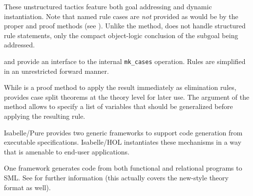 \begin{isabellebody}
\begin{isamarkuptext}
\begin{description}
  These unstructured tactics feature both goal addressing and dynamic
  instantiation.  Note that named rule cases are \emph{not} provided
  as would be by the proper \hyperlink{method.cases}{\mbox{}} and \hyperlink{method.induct}{\mbox{}} proof
  methods (see ).  Unlike the \hyperlink{method.induct}{\mbox{}} method, \hyperlink{method.induct-tac}{\mbox{}} does not handle structured rule
  statements, only the compact object-logic conclusion of the subgoal
  being addressed.
  
  \item \hyperlink{method.HOL.ind-cases}{\mbox{}} and \hyperlink{command.HOL.inductive-cases}{\mbox{}} provide an interface to the internal \verb|mk_cases| operation.  Rules are simplified in an unrestricted
  forward manner.

  While \hyperlink{method.HOL.ind-cases}{\mbox{}} is a proof method to apply the
  result immediately as elimination rules, \hyperlink{command.HOL.inductive-cases}{\mbox{}} provides case split theorems at the theory level
  for later use.  The \hyperlink{keyword.for}{\mbox{}} argument of the \hyperlink{method.HOL.ind-cases}{\mbox{}} method allows to specify a list of variables that should
  be generalized before applying the resulting rule.

  \end{description}%
\end{isamarkuptext}%
\isamarkuptrue%
%
\isamarkuptrue%
%
\begin{isamarkuptext}%
Isabelle/Pure provides two generic frameworks to support code
  generation from executable specifications.  Isabelle/HOL
  instantiates these mechanisms in a way that is amenable to end-user
  applications.

  One framework generates code from both functional and relational
  programs to SML.  See \cite{isabelle-HOL} for further information
  (this actually covers the new-style theory format as well).


\end{isamarkuptext}
\end{isabellebody}
